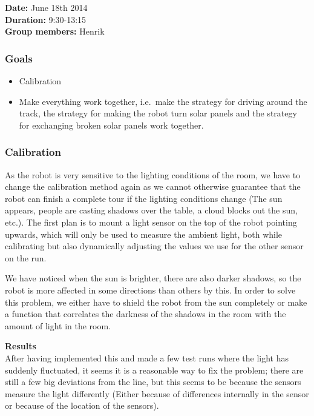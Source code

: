 \textbf{Date:} June 18th 2014\\\textbf{Duration:}
9:30-13:15\\\textbf{Group members:} Henrik

\subsubsection{Goals}

\begin{itemize}
\itemsep1pt\parskip0pt
\item
  Calibration
\item
  Make everything work together, i.e.~make the strategy for driving
  around the track, the strategy for making the robot turn solar panels
  and the strategy for exchanging broken solar panels work together.
\end{itemize}

\subsubsection{Calibration}

As the robot is very sensitive to the lighting conditions of the room,
we have to change the calibration method again as we cannot otherwise
guarantee that the robot can finish a complete tour if the lighting
conditions change (The sun appears, people are casting shadows over the
table, a cloud blocks out the sun, etc.). The first plan is to mount a
light sensor on the top of the robot pointing upwards, which will only
be used to measure the ambient light, both while calibrating but also
dynamically adjusting the values we use for the other sensor on the run.

We have noticed when the sun is brighter, there are also darker shadows,
so the robot is more affected in some directions than others by this. In
order to solve this problem, we either have to shield the robot from the
sun completely or make a function that correlates the darkness of the
shadows in the room with the amount of light in the room.

\textbf{Results}\\After having implemented this and made a few test runs
where the light has suddenly fluctuated, it seems it is a reasonable way
to fix the problem; there are still a few big deviations from the line,
but this seems to be because the sensors measure the light differently
(Either because of differences internally in the sensor or because of
the location of the sensors).


